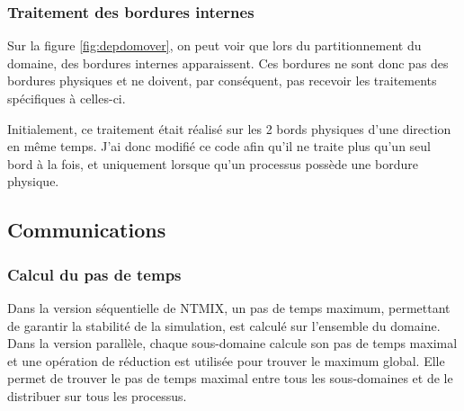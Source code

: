 \subsubsection{Traitement des bordures internes}
Sur la figure \ref{fig:depdomover}, on peut voir que lors du partitionnement du domaine, des bordures internes apparaissent. Ces bordures ne sont donc pas des bordures physiques et ne doivent, par conséquent, pas recevoir les traitements spécifiques à celles-ci.

Initialement, ce traitement était réalisé sur les 2 bords physiques d'une direction en même temps.
J'ai donc modifié ce code afin qu'il ne traite plus qu'un seul bord à la fois, et uniquement lorsque qu'un processus possède une bordure physique. 



\subsection{Communications}\label{sec:comms}

\subsubsection{Calcul du pas de temps}
Dans la version séquentielle de NTMIX, un pas de temps maximum, permettant de garantir la stabilité de la simulation, est calculé sur l'ensemble du domaine.
Dans la version parallèle, chaque sous-domaine calcule son pas de temps maximal et une opération de réduction est utilisée pour trouver le maximum global. Elle permet de trouver le pas de temps maximal entre tous les sous-domaines et de le distribuer sur tous les processus.

